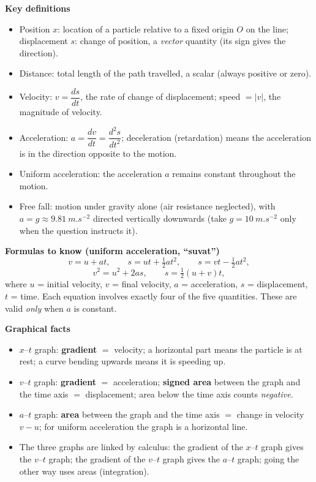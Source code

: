 \documentclass[11pt]{article}
\newcommand{\cle}[1]{{\popxbold\color{popdark}#1}}
\begin{document}
\begin{aretenir}

\textbf{Key definitions}
\begin{itemize}
\item \cle{Position} $x$: location of a particle relative to a fixed origin $O$ on the line; \cle{displacement} $s$: change of position, a \emph{vector} quantity (its sign gives the direction).
\item \cle{Distance}: total length of the path travelled, a scalar (always positive or zero).
\item \cle{Velocity}: $v=\dfrac{ds}{dt}$, the rate of change of displacement; \cle{speed} $=|v|$, the magnitude of velocity.
\item \cle{Acceleration}: $a=\dfrac{dv}{dt}=\dfrac{d^{2}s}{dt^{2}}$; \cle{deceleration} (retardation) means the acceleration is in the direction opposite to the motion.
\item \cle{Uniform acceleration}: the acceleration $a$ remains constant throughout the motion.
\item \cle{Free fall}: motion under gravity alone (air resistance neglected), with $a=g\approx \SI{9.81}{m.s^{-2}}$ directed vertically downwards (take $g=\SI{10}{m.s^{-2}}$ only when the question instructs it).
\end{itemize}

\textbf{Formulas to know (uniform acceleration, ``suvat'')}
\[
v=u+at,\qquad s=ut+\tfrac12 at^{2},\qquad s=vt-\tfrac12 at^{2},
\]
\[
v^{2}=u^{2}+2as,\qquad s=\tfrac12(u+v)t,
\]
where $u$ = initial velocity, $v$ = final velocity, $a$ = acceleration, $s$ = displacement, $t$ = time. Each equation involves exactly four of the five quantities. These are valid \emph{only} when $a$ is constant.

\textbf{Graphical facts}
\begin{itemize}
\item $x$--$t$ graph: \textbf{gradient} $=$ velocity; a horizontal part means the particle is at rest; a curve bending upwards means it is speeding up.
\item $v$--$t$ graph: \textbf{gradient} $=$ acceleration; \textbf{signed area} between the graph and the time axis $=$ displacement; area below the time axis counts \emph{negative}.
\item $a$--$t$ graph: \textbf{area} between the graph and the time axis $=$ change in velocity $v-u$; for uniform acceleration the graph is a horizontal line.
\item The three graphs are linked by calculus: the gradient of the $x$--$t$ graph gives the $v$--$t$ graph; the gradient of the $v$--$t$ graph gives the $a$--$t$ graph; going the other way uses areas (integration).
\end{itemize}


\end{aretenir}
\end{document}
